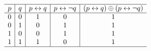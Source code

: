 {{\begin{practices}
\begin{enumerate}[A.]
                {
                    \begin{table}[H]
                        \[
                            \begin{array}{c|c|c|c|c}
                                \hline
                                p & q & p \leftrightarrow q & p \leftrightarrow \neg q & (p \leftrightarrow q) \oplus (p \leftrightarrow \neg q) \\
                                \hline
                                0 & 0 & 1 & 0 & 1 \\
                                0 & 1 & 0 & 1 & 1 \\
                                1 & 0 & 0 & 1 & 1 \\
                                1 & 1 & 1 & 0 & 1 \\
                                \hline
                            \end{array}
                        \]
                    \end{table}
                }
            \end{enumerate}
        \end{practices}

}}
